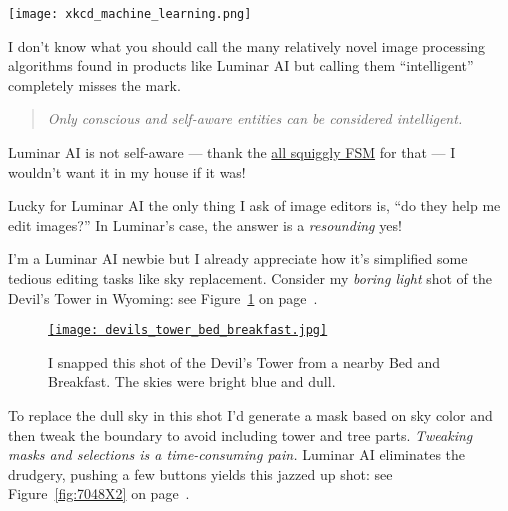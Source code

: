 \captionsetup[figure]{labelformat=default}
 \begin{SCfigure}[50]
 \centering
 \texttt{[image: xkcd\_machine\_learning.png]}
 \caption{\href{https://xkcd.com/1838/}{XKCD} is umimpressed with the misleading moniker ``Machine Learning.''
Computer nerds name things as badly as suburban housing developers. Bad
terminology leads to muddled thinking. As hyperbolic screeching lefties
repeat \emph{ad nauseam}, \href{https://www.facebook.com/PoliticalHype/videos/401536327743389/}{``Words Matter!.''}
}
 \label{fig:7048X0}
 \end{SCfigure}


I don't know what you should call the many relatively novel image
processing algorithms found in products like Luminar AI but calling them
``intelligent'' completely misses the mark.

\begin{quote}
\emph{Only conscious and self-aware entities can be considered intelligent.}
\end{quote}

Luminar AI is not self-aware --- thank the
\href{https://www.spaghettimonster.org/}{all squiggly FSM} for that ---
I wouldn't want it in my house if it was!

Lucky for Luminar AI the only thing I ask of image editors is, ``do they
help me edit images?'' In Luminar's case, the answer is a
\emph{resounding} yes!

I'm a Luminar AI newbie but I already appreciate how it's simplified
some tedious editing tasks like sky replacement. Consider my
\emph{boring light} shot of the Devil's Tower in Wyoming: see Figure~\ref{fig:7048X1} on page~\pageref{fig:7048X1}.


\captionsetup[figure]{labelformat=default}
\begin{figure}[htbp]
\centering
\href{https://conceptcontrol.smugmug.com/Trips/USA-and-Canada/Western-Road-Trip-2015/i-Dq2KDP4/A}{\texttt{[image: devils\_tower\_bed\_breakfast.jpg]}}
\caption{I snapped this shot of the Devil's Tower from a nearby Bed and Breakfast. The skies
were bright blue and dull.} 
\label{fig:7048X1}
\end{figure}

To replace the dull sky in this shot I'd generate a mask based on sky
color and then tweak the boundary to avoid including tower and tree
parts. \emph{Tweaking masks and selections is a time-consuming pain.}
Luminar AI eliminates the drudgery, pushing a few buttons yields this jazzed up shot: see Figure~\ref{fig:7048X2} on page~\pageref{fig:7048X2}.

